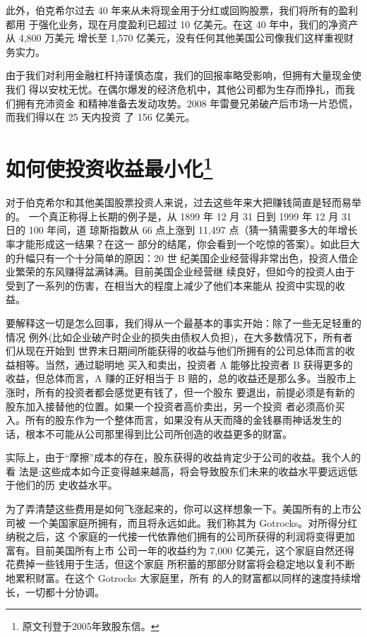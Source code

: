 \documentclass[UTF8,a4paper,zihao=-4,fontset = windows]{ctexart} %
\begin{document}
此外，伯克希尔过去 40 年来从未将现金用于分红或回购股票，我们将所有的盈利都用
于强化业务，现在月度盈利已超过 10 亿美元。在这 40 年中，我们的净资产从 4,800 万美元
增长至 1,570 亿美元，没有任何其他美国公司像我们这样重视财务实力。

由于我们对利用金融杠杆持谨慎态度，我们的回报率略受影响，但拥有大量现金使我们
得以安枕无忧。在偶尔爆发的经济危机中，其他公司都为生存而挣扎，而我们拥有充沛资金
和精神准备去发动攻势。2008 年雷曼兄弟破产后市场一片恐慌，而我们得以在 25 天内投资
了 156 亿美元。

\section[如何使投资收益最小化]{如何使投资收益最小化\footnote{原文刊登于2005年致股东信。}}

对于伯克希尔和其他美国股票投资人来说，过去这些年来大把赚钱简直是轻而易举的。
一个真正称得上长期的例子是，从 1899 年 12 月 31 日到 1999 年 12 月 31 日的 100 年间，道
琼斯指数从 66 点上涨到 11,497 点（猜一猜需要多大的年增长率才能形成这一结果？在这一
部分的结尾，你会看到一个吃惊的答案）。如此巨大的升幅只有一个十分简单的原因：20 世
纪美国企业经营得非常出色，投资人借企业繁荣的东风赚得盆满钵满。目前美国企业经营继
续良好，但如今的投资人由于受到了一系列的伤害，在相当大的程度上减少了他们本来能从
投资中实现的收益。

要解释这一切是怎么回事，我们得从一个最基本的事实开始：除了一些无足轻重的情况
例外(比如企业破产时企业的损失由债权人负担)，在大多数情况下，所有者们从现在开始到
世界末日期间所能获得的收益与他们所拥有的公司总体而言的收益相等。当然，通过聪明地
买入和卖出，投资者 A 能够比投资者 B 获得更多的收益，但总体而言，A 赚的正好相当于 B
赔的，总的收益还是那么多。当股市上涨时，所有的投资者都会感觉更有钱了，但一个股东
要退出，前提必须是有新的股东加入接替他的位置。如果一个投资者高价卖出，另一个投资
者必须高价买入。所有的股东作为一个整体而言，如果没有从天而降的金钱暴雨神话发生的
话，根本不可能从公司那里得到比公司所创造的收益更多的财富。

实际上，由于“摩擦”成本的存在，股东获得的收益肯定少于公司的收益。我个人的看
法是:这些成本如今正变得越来越高，将会导致股东们未来的收益水平要远远低于他们的历
史收益水平。

为了弄清楚这些费用是如何飞涨起来的，你可以这样想象一下。美国所有的上市公司被
一个美国家庭所拥有，而且将永远如此。我们称其为 Gotrocks。对所得分红纳税之后，这
个家庭的一代接一代依靠他们拥有的公司所获得的利润将变得更加富有。目前美国所有上市
公司一年的收益约为 7,000 亿美元，这个家庭自然还得花费掉一些钱用于生活，但这个家庭
所积蓄的那部分财富将会稳定地以复利不断地累积财富。在这个 Gotrocks 大家庭里，所有
的人的财富都以同样的速度持续增长，一切都十分协调。
\end{document}

